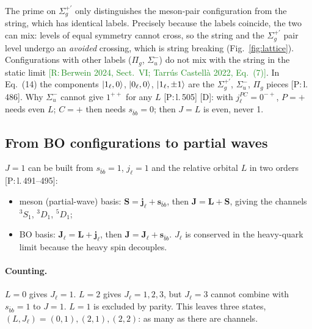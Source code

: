 \documentclass[11pt,a4paper]{article}
\newcommand{\tagP}[1]{\textcolor{blue!65!black}{\textsf{\small[P:\,#1]}}}
\newcommand{\tagR}[1]{\textcolor{ForestGreen}{\textsf{\small[R:\,#1]}}}
\newcommand{\tagD}{\textcolor{orange!85!black}{\textsf{\small[D]}}}
\begin{document}
The prime on $\Sigma_g^{+\prime}$ only distinguishes the meson-pair configuration from the string, which has identical labels. Precisely because the labels coincide, the two can mix: levels of equal symmetry cannot cross, so the string and the $\Sigma_g^{+\prime}$ pair level undergo an \emph{avoided} crossing, which is string breaking (Fig.~\ref{fig:lattice}). Configurations with other labels ($\Pi_g$, $\Sigma_u^-$) do not mix with the string in the static limit \tagR{Berwein 2024, Sect.~VI; Tarr\'us Castell\`a 2022, Eq.~(7)}. In Eq.~(14) the components $\ket{1_\ell,0}$, $\ket{0_\ell,0}$, $\ket{1_\ell,\pm1}$ are the $\Sigma_g^{+\prime}$, $\Sigma_u^-$, $\Pi_g$ pieces \tagP{l.\,486}. Why $\Sigma_u^-$ cannot give $1^{++}$ for any $L$ \tagP{l.\,505} \tagD: with $j_\ell^{PC}=0^{-+}$, $P=+$ needs even $L$; $C=+$ then needs $s_{\bar bb}=0$; then $J=L$ is even, never 1.

\subsection{From BO configurations to partial waves}
\label{sec:qn-recoupling}

$J=1$ can be built from $s_{\bar bb}=1$, $j_\ell=1$ and the relative orbital $L$ in two orders \tagP{l.\,491--495}:
\begin{itemize}
\item meson (partial-wave) basis: $\bm S=\bm j_\ell+\bm s_{\bar bb}$, then $\bm J=\bm L+\bm S$, giving the channels $^3S_1$, $^3D_1$, $^5D_1$;
\item BO basis: $\bm J_\ell=\bm L+\bm j_\ell$, then $\bm J=\bm J_\ell+\bm s_{\bar bb}$. $J_\ell$ is conserved in the heavy-quark limit because the heavy spin decouples.
\end{itemize}
\paragraph{Counting.} $L=0$ gives $J_\ell=1$. $L=2$ gives $J_\ell=1,2,3$, but $J_\ell=3$ cannot combine with $s_{\bar bb}=1$ to $J=1$. $L=1$ is excluded by parity. This leaves three states, $(L,J_\ell)=(0,1),(2,1),(2,2)$: as many as there are channels.
\end{document}
